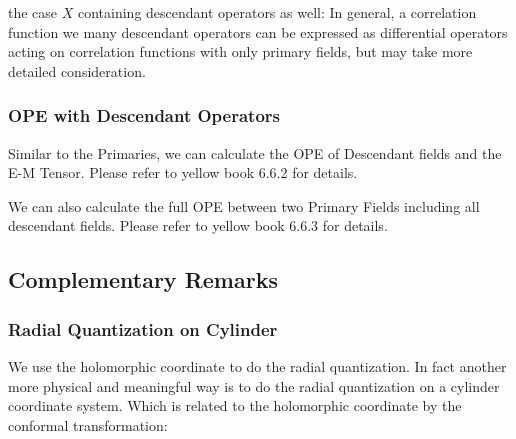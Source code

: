 the case $ X $ containing descendant operators as well:
In general, a correlation function we many descendant operators can
be expressed as differential operators acting on correlation
functions with only primary fields, but may take more detailed consideration.

\subsubsection{OPE with Descendant Operators}

Similar to the Primaries, we can calculate the OPE of Descendant
fields and the E-M Tensor. Please refer to yellow book 6.6.2 for details.

We can also calculate the full OPE between two Primary Fields
including all descendant fields. Please refer to yellow book 6.6.3 for details.

\subsection{Complementary Remarks}

\subsubsection{Radial Quantization on Cylinder}

We use the holomorphic coordinate to do the radial quantization. In
fact another more physical and meaningful way is to do the radial
quantization on a cylinder coordinate system. Which is related to the
holomorphic coordinate by the conformal transformation:
